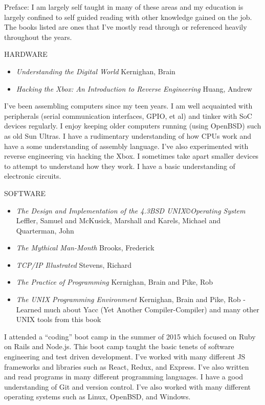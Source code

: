 \documentclass[12pt]{report}
\begin{document}
Preface: I am largely self taught in many of these areas and my education is largely confined to self guided reading with other knowledge gained on the job. The books listed are ones that I've mostly read through or referenced heavily throughout the years.\hfill \break

HARDWARE
\begin{itemize}
  \item \emph {Understanding the Digital World} Kernighan, Brain
  \item \emph {Hacking the Xbox: An Introduction to Reverse Engineering} Huang, Andrew
\end{itemize}
I've been assembling computers since my teen years. I am well acquainted with peripherals (serial communication interfaces, GPIO, et al) and tinker with SoC devices regularly. I enjoy keeping older computers running (using OpenBSD) such as old Sun Ultras. I have a rudimentary understanding of how CPUs work and have a some understanding of assembly language. I've also experimented with reverse engineering via hacking the Xbox. I sometimes take apart smaller devices to attempt to understand how they work. I have a basic understanding of electronic circuits.\hfill \break

SOFTWARE
\begin{itemize}
  \item \emph {The Design and Implementation of the 4.3BSD UNIX\copyright Operating System} Leffler, Samuel and McKusick, Marshall and Karels, Michael and Quarterman, John
  \item \emph {The Mythical Man-Month} Brooks, Frederick
  \item \emph {TCP/IP Illustrated} Stevens, Richard
  \item \emph {The Practice of Programming} Kernighan, Brain and Pike, Rob
  \item \emph {The UNIX Programming Environment} Kernighan, Brain and Pike, Rob - Learned much about Yacc (Yet Another Compiler-Compiler) and many other UNIX tools from this book
\end{itemize}
I attended a ``coding'' boot camp in the summer of 2015 which focused on Ruby on Rails and Node.js. This boot camp taught the basic tenets of software engineering and test driven development. I've worked with many different JS frameworks and libraries such as React, Redux, and Express. I've also written and read programs in many different programming languages. I have a good understanding of Git and version control. I've also worked with many different operating systems such as Linux, OpenBSD, and Windows.\hfill \break 
\end{document}
